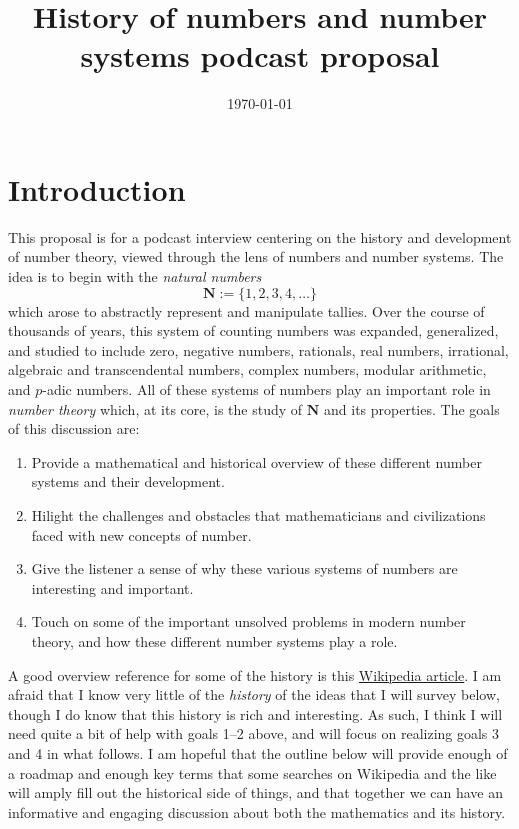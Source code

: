 \documentclass[11pt]{amsart}
\newcommand*{\N}{\ensuremath{\mathbf{N}}}
\theoremstyle{plain}
\theoremstyle{definition}
\theoremstyle{remark}
\numberwithin{theorem}{section}
\numberwithin{equation}{section}
\begin{document}
\title{History of numbers and number systems podcast proposal}




\subjclass[2010]{}
\keywords{}
\date{\today}



\maketitle

\section{Introduction}

This proposal is for a podcast interview centering on the history and development of number theory, 
viewed through the lens of numbers and number systems.  The idea is to begin with the {\em natural numbers}
$$
\N:=\{1,2,3,4,\ldots\}
$$
which arose to abstractly represent and manipulate tallies.  Over the course of thousands of years, this
system of counting numbers was expanded, generalized, and studied to include zero, negative numbers,
rationals, real numbers, irrational, algebraic and transcendental numbers, complex numbers, 
modular arithmetic, and $p$-adic numbers.  All of these systems of numbers play an important role in
{\em number theory} which, at its core, is the study of $\N$ and its properties.  The goals of this discussion are:
\begin{enumerate}
	\item Provide a mathematical and historical overview of these different number systems and their development.
	\item Hilight the challenges and obstacles that mathematicians and civilizations faced with new concepts of number.
	\item Give the listener a sense of why these various systems of numbers are interesting and important.
	\item Touch on some of the important unsolved problems in modern number theory, and how these different number systems play a role.
\end{enumerate} 
A good overview reference for some of the history is this \href{https://en.wikipedia.org/wiki/Number}{Wikipedia article}.
I am afraid that I know very little of the {\em history} of the ideas that I will survey below, though I do know that this history is
rich and interesting.  As such, I think I will need quite a bit of help with goals 1--2 above, and will focus on realizing goals 3 and 4 in what follows.
I am hopeful that the outline below will provide enough of a roadmap and enough key terms that some searches on Wikipedia 
and the like will amply fill out the historical side of things, and that together we can have an informative and engaging discussion
about both the mathematics and its history.
\end{document}
